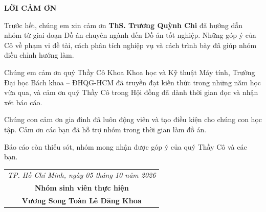 \newpage
\begin{center}
\textbf{\LARGE LỜI CẢM ƠN}
\end{center}
\vspace{0.5cm}

\par Trước hết, chúng em xin cảm ơn \textbf{ThS. Trương Quỳnh Chi} đã hướng dẫn nhóm từ giai đoạn Đồ án chuyên ngành đến Đồ án tốt nghiệp. Những góp ý của Cô về phạm vi đề tài, cách phân tích nghiệp vụ và cách trình bày đã giúp nhóm điều chỉnh hướng làm.

\par Chúng em cảm ơn quý Thầy Cô Khoa Khoa học và Kỹ thuật Máy tính, Trường Đại học Bách khoa -- ĐHQG-HCM đã truyền đạt kiến thức trong những năm học vừa qua, và cảm ơn quý Thầy Cô trong Hội đồng đã dành thời gian đọc và nhận xét báo cáo.

\par Chúng con cảm ơn gia đình đã luôn động viên và tạo điều kiện cho chúng con học tập. Cảm ơn các bạn đã hỗ trợ nhóm trong thời gian làm đồ án.

\par Báo cáo còn thiếu sót, nhóm mong nhận được góp ý của quý Thầy Cô và các bạn.

\vspace{1.5cm}
\begin{flushright}
\begin{tabular}{c}
\textit{TP. Hồ Chí Minh, ngày 05 tháng 10 năm 2026} \\
\textbf{Nhóm sinh viên thực hiện} \\[2cm]
\textbf{Vương Song Toàn \hspace{1.5cm} Lê Đăng Khoa}
\end{tabular}
\end{flushright}
